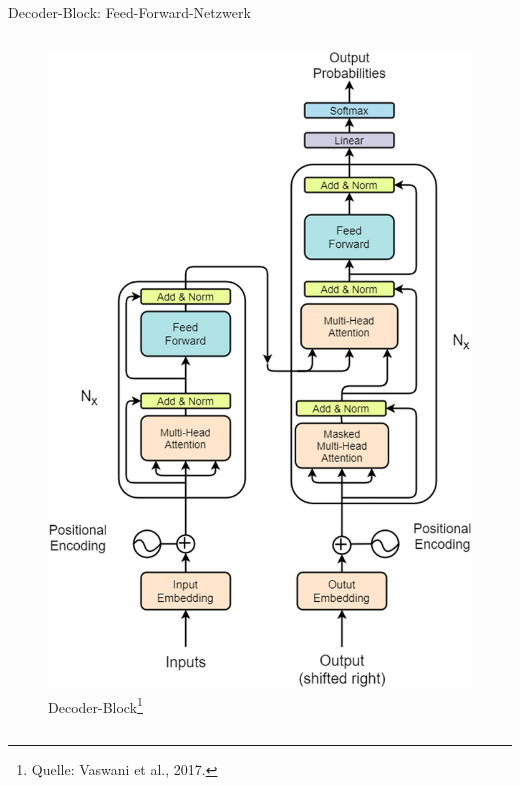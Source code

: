 \documentclass[aspectratio=1610, xcolor=dvipsnames, 9pt]{beamer}
\begin{document}
\begin{frame}{Decoder-Block: Feed-Forward-Netzwerk}
\begin{columns}
\begin{column}{0.3\textwidth}
\begin{figure}
        \includegraphics[width=0.9\columnwidth]{images/Transformer-architecture-figure-sourced-from-original-paper-26.png}
        \caption{Decoder-Block\footnote{Quelle: Vaswani et al., 2017.}}
      \end{figure}
    \end{column}
  \end{columns}
\end{frame}
\end{document}
